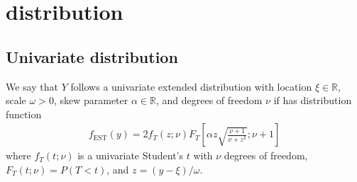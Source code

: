 %
%




\section{\Skewt distribution} \label{sta:skewt}
\subsection*{Univariate \skewt distribution}
We say that $Y$ follows a univariate extended \skewt distribution with location $\xi \in \mathbb{R}$, scale $\omega > 0$, skew parameter $\alpha \in \mathbb{R}$, and degrees of freedom $\nu$ if has distribution function
\begin{align}
  f_{\text{EST}}(y) = 2 f_T (z; \nu) F_T\left[ \alpha z \sqrt{ \frac{ \nu + 1 }{ \nu + z^2}}; \nu + 1 \right]
\end{align}
where $f_T(t; \nu)$ is a univariate Student's $t$ with $\nu$ degrees of freedom, $F_T(t; \nu) = P(T < t)$, and \hbox{$z = (y - \xi) / \omega$}.

